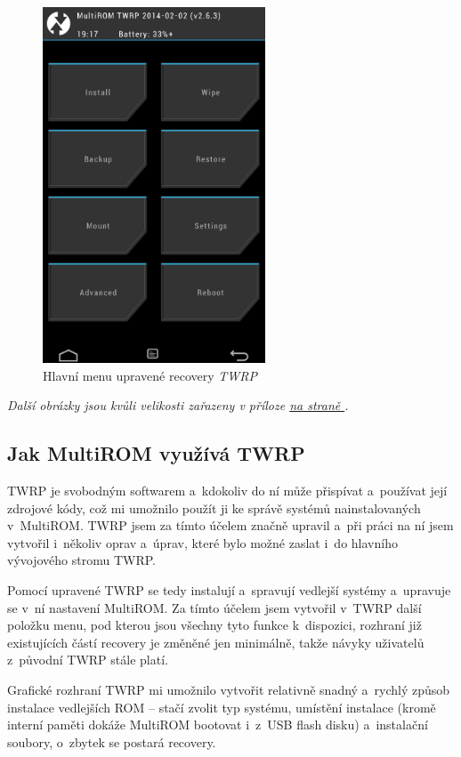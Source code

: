 \documentclass[12pt, a4paper, oneside]{article}
\newcommand{\It}{\textit}  %
\newcommand*{\attref}[1]{\hyperref[{#1}]{\uv{\nameref*{#1}} na straně \pageref{#1}}}
\begin{document}
\begin{figure}[H]
\begin{center}
 \includegraphics[width=250px]{img/recovery.png}
\caption{Hlavní menu upravené recovery \It{TWRP}}
\end{center}
\end{figure}
\vspace{-20pt}
\noindent \It{Další obrázky jsou kvůli velikosti zařazeny v příloze \attref{obrazky}.}

\subsection{Jak MultiROM využívá TWRP}
TWRP je svobodným softwarem a~kdokoliv do ní může přispívat a~používat její zdrojové kódy, což mi umožnilo použít ji ke správě systémů nainstalovaných v~MultiROM. TWRP jsem za tímto účelem značně upravil a~při práci na ní jsem vytvořil i~několiv oprav a~úprav, které bylo možné zaslat i~do hlavního vývojového stromu TWRP.

Pomocí upravené TWRP se tedy instalují a~spravují vedlejší systémy a~upravuje se v~ní nastavení MultiROM. Za tímto účelem jsem vytvořil v~TWRP další položku menu, pod kterou jsou všechny tyto funkce k~dispozici, rozhraní již existujících částí recovery je změněné jen minimálně, takže návyky uživatelů z~původní TWRP stále platí.

Grafické rozhraní TWRP mi umožnilo vytvořit relativně snadný a~rychlý způsob instalace vedlejších ROM -- stačí zvolit typ systému, umístění instalace (kromě interní paměti dokáže MultiROM bootovat i~z~USB flash disku) a~instalační soubory, o~zbytek se postará recovery.
\end{document}
